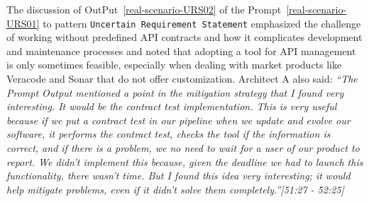 

The discussion of OutPut~\ref{real-scenario-URS02} of the Prompt~\ref{real-scenario-URS01} to pattern \texttt{Uncertain Requirement Statement} emphasized the challenge of working without predefined API contracts and how it complicates development and maintenance processes and noted that adopting a tool for API management is only sometimes feasible, especially when dealing with market products like Veracode and Sonar that do not offer customization. Architect A also said: \textit{``The Prompt Output mentioned a point in the mitigation strategy that I found very interesting. It would be the contract test implementation. This is very useful because if we put a contract test in our pipeline when we update and evolve our software, it performs the contract test, checks the tool if the information is correct, and if there is a problem, we no need to wait for a user of our product to report. We didn't implement this because, given the deadline we had to launch this functionality, there wasn't time. But I found this idea very interesting; it would help mitigate problems, even if it didn't solve them completely.''[51:27 - 52:25]}




